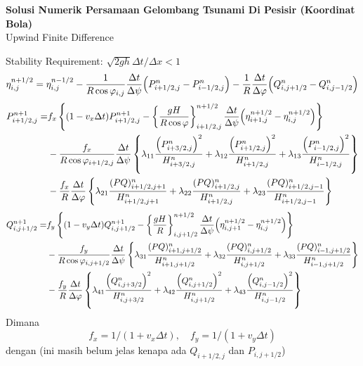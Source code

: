 \documentclass{article}
\begin{document}
\begin{center}
    \textbf{Solusi Numerik Persamaan Gelombang Tsunami Di Pesisir (Koordinat Bola)}
    \\Upwind Finite Difference
\end{center}
Stability Requirement: $\sqrt{2gh}\Delta t/\Delta x < 1$
\begin{equation}
    \eta_{i,j}^{n+1/2} = \eta_{i,j}^{n-1/2} - \frac{1}{R\cos\varphi_{i,j}}\frac{\Delta t}{\Delta \psi}
    \oio*{P_{i+1/2,j}^n-P_{i-1/2,j}^n}-\frac{1}{R}\frac{\Delta t}{\Delta \varphi}
    \oio*{Q_{i,j+1/2}^n-Q_{i,j-1/2}^n}
\end{equation}
\begin{align*}
    P_{i+1/2,j}^{n+1}=&f_x\left\{(1-v_x\Delta t)P_{i+1/2,j}^{n+1}
    -\left\{\frac{gH}{R\cos\varphi}\right\}_{i+1/2,j}^{n+1/2}\frac{\Delta t}{\Delta \psi}
    \oio*{\eta_{i+1,j}^{n+1/2}-\eta_{i,j}^{n+1/2}}\right\}\\
    &-\frac{f_x}{R\cos\varphi_{i+1/2,j}}\frac{\Delta t}{\Delta \psi}\left\{
    \lambda_{11}\frac{\oio*{P_{i+3/2,j}^n}^2}{H_{i+3/2,j}^n}
    +\lambda_{12}\frac{\oio*{P_{i+1/2,j}^n}^2}{H_{i+1/2,j}^n}
    +\lambda_{13}\frac{\oio*{P_{i-1/2,j}^n}^2}{H_{i-1/2,j}^n}
    \right\}\\
    &-\frac{f_x}{R}\frac{\Delta t}{\Delta \varphi}\left\{
    \lambda_{21}\frac{(PQ)^n_{i+1/2,j+1}}{H_{i+1/2,j+1}^n}
    +\lambda_{22}\frac{(PQ)^n_{i+1/2,j}}{H_{i+1/2,j}^n}
    +\lambda_{23}\frac{(PQ)^n_{i+1/2,j-1}}{H_{i+1/2,j-1}^n}
    \right\}
\end{align*}
\begin{align*}
    Q_{i,j+1/2}^{n+1}=&f_y\left\{(1-v_y\Delta t)Q_{i,j+1/2}^{n+1}
    -\left\{\frac{gH}{R}\right\}_{i,j+1/2}^{n+1/2}\frac{\Delta t}{\Delta \psi}
    \oio*{\eta_{i,j+1}^{n+1/2}-\eta_{i,j}^{n+1/2}}\right\}\\
    &-\frac{f_y}{R\cos\varphi_{i,j+1/2}}\frac{\Delta t}{\Delta \psi}\left\{
    \lambda_{31}\frac{(PQ)^n_{i+1,j+1/2}}{H_{i+1,j+1/2}^n}
    +\lambda_{32}\frac{(PQ)^n_{i,j+1/2}}{H_{i,j+1/2}^n}
    +\lambda_{33}\frac{(PQ)^n_{i-1,j+1/2}}{H_{i-1,j+1/2}^n}
    \right\}\\
    &-\frac{f_y}{R}\frac{\Delta t}{\Delta \varphi}\left\{
    \lambda_{41}\frac{\oio*{Q_{i,j+3/2}^n}^2}{H_{i,j+3/2}^n}
    +\lambda_{42}\frac{\oio*{Q_{i,j+1/2}^n}^2}{H_{i,j+1/2}^n}
    +\lambda_{43}\frac{\oio*{Q_{i,j-1/2}^n}^2}{H_{i,j-1/2}^n}
    \right\}
\end{align*}
Dimana 
\[
f_x=1/(1+v_x\Delta t),\quad f_y=1/(1+v_y\Delta t)
\]
dengan (ini masih belum jelas kenapa ada $Q_{i+1/2,j}$ dan $P_{i,j+1/2}$)
\end{document}
